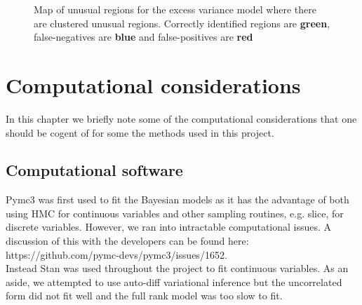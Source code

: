 \documentclass[11pt]{report}
\begin{document}
\begin{figure}
\centering
{}
\label{fig:unusual}
\caption{Map of unusual regions for the excess variance model where there are clustered unusual regions. Correctly identified regions are {\color{Green} \bf green}, false-negatives are {\color{Blue}\bf blue} and false-positives are {\color{Red}\bf red}}
\end{figure}

\chapter{Computational considerations}

In this chapter we briefly note some of the computational considerations that one should be cogent of for some the methods used in this project.

\section{Computational software}

Pymc3 was first used to fit the Bayesian models as it has the advantage of both using HMC for continuous variables and other sampling routines, e.g. slice, for discrete variables. However, we ran into intractable computational issues. A discussion of this with the developers can be found here: https://github.com/pymc-devs/pymc3/issues/1652. \\

Instead Stan was used throughout the project to fit continuous variables. As an aside, we attempted to use auto-diff variational inference but the uncorrelated form did not fit well and the full rank model was too slow to fit.
 
\end{document}
